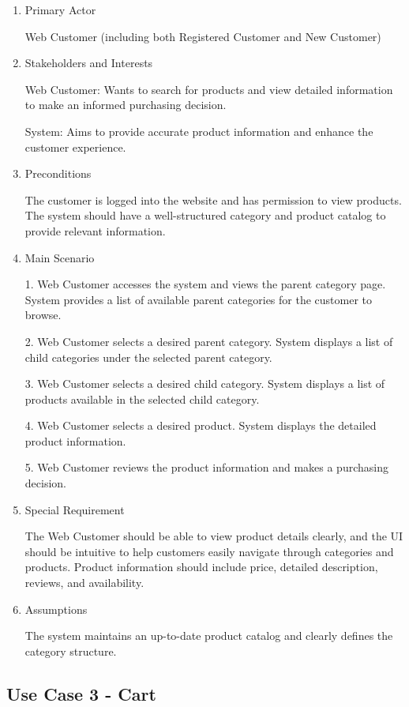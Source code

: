 \documentclass[conference]{IEEEtran}
\begin{document}
\begin{enumerate}
\setlength{\parindent}{2ex}
\item Primary Actor

Web Customer (including both Registered Customer and New Customer)
\item Stakeholders and Interests

Web Customer: Wants to search for products and view detailed information to make an informed purchasing decision. 

System: Aims to provide accurate product information and enhance the customer experience.
\item Preconditions

The customer is logged into the website and has permission to view products.
The system should have a well-structured category and product catalog to provide relevant information.
\item Main Scenario

1. Web Customer accesses the system and views the parent category page.
System provides a list of available parent categories for the customer to browse.

2. Web Customer selects a desired parent category.
System displays a list of child categories under the selected parent category.

3. Web Customer selects a desired child category.
System displays a list of products available in the selected child category.

4. Web Customer selects a desired product.
System displays the detailed product information.

5. Web Customer reviews the product information and makes a purchasing decision.
\item Special Requirement

The Web Customer should be able to view product details clearly, and the UI should be intuitive to help customers easily navigate through categories and products.
Product information should include price, detailed description, reviews, and availability.
\item Assumptions

The system maintains an up-to-date product catalog and clearly defines the category structure.

\end{enumerate}

\subsection{Use Case 3 - Cart}
\end{document}
